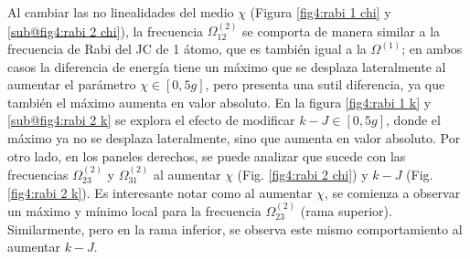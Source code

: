 
Al cambiar las no linealidades del medio $\chi$ (Figura \ref{fig4:rabi 1 chi} y \ref{sub@fig4:rabi 2 chi}), la frecuencia $\Omega^{(2)}_{12}$ se comporta de manera similar a la frecuencia de Rabi del JC de 1 átomo, que es también igual a la $\Omega^{(1)}$; en ambos casos la diferencia de energía tiene un máximo que se desplaza lateralmente al aumentar el parámetro $\chi\in[0,5g]$, pero presenta una sutil diferencia, ya que también el máximo aumenta en valor absoluto. En la figura \ref{fig4:rabi 1 k} y \ref{sub@fig4:rabi 2 k} se explora el efecto de modificar $k-J\in [0,5g]$, donde el máximo ya no se desplaza lateralmente, sino que aumenta en valor absoluto. Por otro lado, en los paneles derechos, se puede analizar que sucede con las frecuencias $\Omega^{(2)}_{23}$ y $\Omega^{(2)}_{31}$ al aumentar $\chi$ (Fig. \ref{fig4:rabi 2 chi}) y $k-J$ (Fig. \ref{fig4:rabi 2 k}). Es interesante notar como al aumentar $\chi$, se comienza a observar un máximo y mínimo local para la frecuencia $\Omega^{(2)}_{23}$ (rama superior). Similarmente, pero en la rama inferior, se observa este mismo comportamiento al aumentar $k-J$.

